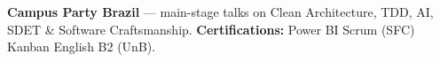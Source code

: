 
\medskip
{}
\textbf{Campus Party Brazil} — main-stage talks on Clean Architecture, TDD, AI, SDET \& Software Craftsmanship.
\divider
\textbf{Certifications:} Power BI \textbullet{} Scrum (SFC) \textbullet{} Kanban \textbullet{} English B2 (UnB).
